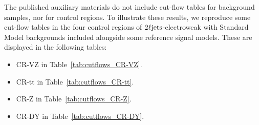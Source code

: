 The published auxiliary materials do not include cut-flow tables for background
samples, nor for control regions.
To illustrate these results, we reproduce some cut-flow tables in the four
control regions of $2\ell\mathrm{jets}$-electroweak with Standard Model backgrounds
included alongside some reference signal models.
These are displayed in the following tables:
\begin{itemize}
\item CR-VZ in Table~\ref{tab:cutflows_CR-VZ}.
\item CR-tt in Table~\ref{tab:cutflows_CR-tt}.
\item CR-Z in Table~\ref{tab:cutflows_CR-Z}.
\item CR-DY in Table~\ref{tab:cutflows_CR-DY}.
\end{itemize}

\FloatBarrier


